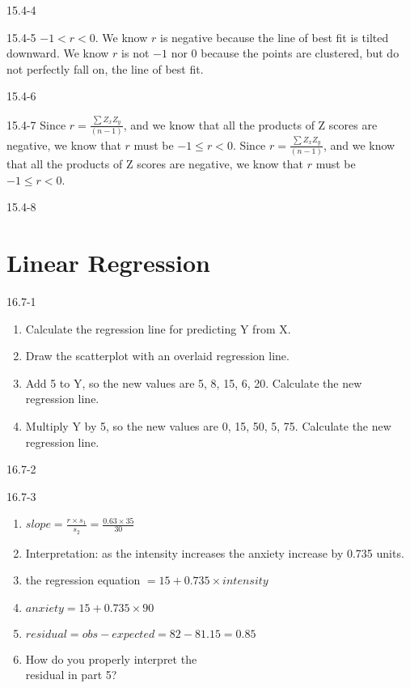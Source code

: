 \begin{exsol@solution}{15.4-4}

\end{exsol@solution}
\begin{exsol@solution}{15.4-5}
$ -1 < r < 0$. We know $r$ is negative because the line of best fit is tilted downward. We know $r$ is not $-1$ nor $0$ because the points are clustered, but do not perfectly fall on, the line of best fit.

\end{exsol@solution}
\begin{exsol@solution}{15.4-6}
\end{exsol@solution}
\begin{exsol@solution}{15.4-7}
Since $ r = \frac{ \sum Z_x Z_y}{(n - 1)}$, and we know that all the products of Z scores are negative, we know that $r$ must be $-1 \le r < 0$. Since $ r = \frac{ \sum Z_x Z_y}{(n - 1)}$, and we know that all the products of Z scores are negative, we know that $r$ must be $-1 \le r < 0$.
\end{exsol@solution}
\begin{exsol@solution}{15.4-8}


\end{exsol@solution}
\setcounter{chapter}{15}\chapter{Linear Regression}
\begin{exsol@solution}{16.7-1}
\begin{enumerate}
  \item Calculate the regression line for predicting Y from X.
  \item Draw the scatterplot with an overlaid regression line.
  \item Add 5 to Y, so the new values are 5, 8, 15, 6, 20.  Calculate the new regression line.
  \item Multiply Y by 5, so the new values are 0, 15, 50, 5, 75.  Calculate the new regression line.
\end{enumerate}

\end{exsol@solution}
\begin{exsol@solution}{16.7-2}
\end{exsol@solution}
\begin{exsol@solution}{16.7-3}

   \begin{enumerate}
  \item $slope = \frac{ r \times s_1}{s_2} = \frac{0.63 \times 35}{30}$
  \item	Interpretation: as the intensity increases the anxiety increase by 0.735 units.
  \item	the regression equation $ = 15 + 0.735 \times intensity$
  \item	 $anxiety = 15 + 0.735 \times 90 $
  \item	$ residual = obs - expected = 82 - 81.15 = 0.85$
  \item	How do you properly interpret the \\ residual in part 5?
\end{enumerate}

\end{exsol@solution}
